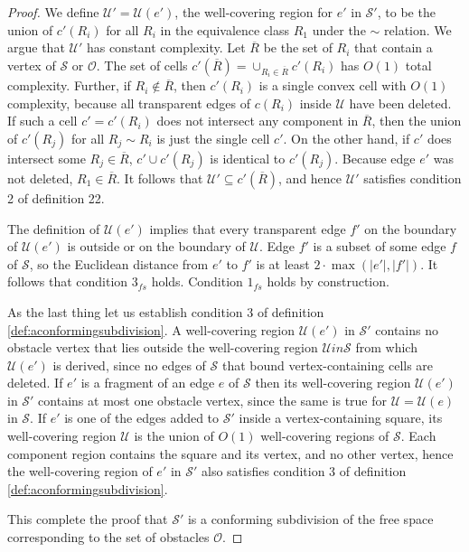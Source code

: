 \begin{proof}
We define $\mathcal{U}'=\mathcal{U}(e')$, the well-covering region for $e'$ in
$\mathcal{S}'$, to be the union of $c'(R_i)$ for all $R_i$ in the equivalence
class $R_1$ under the $\sim$ relation. We argue that $\mathcal{U}'$ has
constant complexity. Let $\overline{R}$ be the set of $R_i$ that contain a
vertex of $\mathcal{S}$ or $\mathcal{O}$. The set of cells
$c'(\overline{R})=\cup_{R_i\in \overline{R}}c'(R_i)$ has $O(1)$ total
complexity. Further, if $R_i\not\in\overline{R}$, then $c'(R_i)$ is a single
convex cell with $O(1)$ complexity, because all transparent edges of $c(R_i)$
inside $\mathcal{U}$ have been deleted. If such a cell $c'=c'(R_i)$ does not
intersect any component in $\overline{R}$, then the union of $c'(R_j)$ for all
$R_j\sim R_i$ is just the single cell $c'$. On the other hand, if $c'$ does
intersect some $R_j\in\overline{R}$, $c'\cup c'(R_j)$ is identical to
$c'(R_j)$. Because edge $e'$ was not deleted, $R_1\in\overline{R}$. It follows
that $\mathcal{U}'\subseteq c'(\overline{R})$, and hence $\mathcal{U}'$
satisfies condition 2 of definition 22.

The definition of $\mathcal{U}(e')$ implies that every transparent edge $f'$ on
the boundary of $\mathcal{U}(e')$ is outside or on the boundary of
$\mathcal{U}$. Edge $f'$ is a subset of some edge $f$ of $\mathcal{S}$, so the
Euclidean distance from $e'$ to $f'$ is at least $2\cdot \max(|e'|,|f'|)$. It
follows that condition $3_{fs}$ holds. Condition $1_{fs}$ holds by
construction. 

As the last thing let us establish condition 3 of definition
\ref{def:aconformingsubdivision}. A well-covering region $\mathcal{U}(e')$ in
$\mathcal{S'}$ contains no obstacle vertex that lies outside the well-covering
region $\mathcal{U} in \mathcal{S}$ from which $\mathcal{U}(e')$ is derived,
since no edges of $\mathcal{S}$ that bound vertex-containing cells are deleted.
If $e'$ is a fragment of an edge $e$ of $\mathcal{S}$ then its well-covering
region $\mathcal{U}(e')$ in $\mathcal{S}'$ contains at most one obstacle
vertex, since the same is true for $\mathcal{U}=\mathcal{U}(e)$ in
$\mathcal{S}$. If $e'$ is one of the edges added to $\mathcal{S}'$ inside a
vertex-containing square, its well-covering region $\mathcal{U}$ is the union
of $O(1)$ well-covering regions of $\mathcal{S}$. Each component region
contains the square and its vertex, and no other vertex, hence the
well-covering region of $e'$ in $\mathcal{S}'$ also satisfies condition 3 of
definition \ref{def:aconformingsubdivision}.

This complete the proof that $\mathcal{S}'$ is a conforming subdivision of the free space corresponding to the set of obstacles $\mathcal{O}$.
\end{proof}

